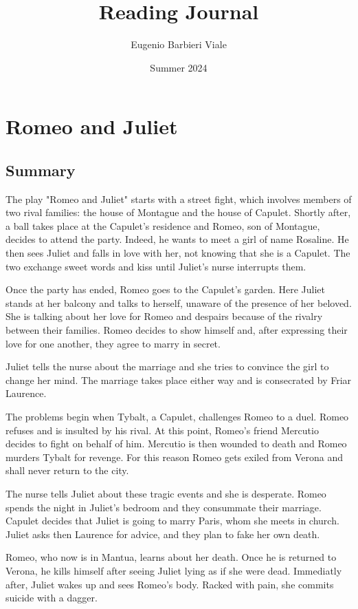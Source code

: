 \documentclass[]{article}
\title{Reading Journal}
\author{Eugenio Barbieri Viale}
\date{Summer 2024}
\begin{document}
\maketitle
{}
\tableofcontents
\newpage

\section{Romeo and Juliet}
\subsection*{Summary}
\hspace{1em}
The play "Romeo and Juliet" starts with a street fight, which involves members of two rival families: the house of Montague and the house of Capulet. Shortly after, a ball takes place at the Capulet's residence and Romeo, son of Montague, decides to attend the party. Indeed, he wants to meet a girl of name Rosaline. He then sees Juliet and falls in love with her, not knowing that she is a Capulet. The two exchange sweet words and kiss until Juliet's nurse interrupts them.

Once the party has ended, Romeo goes to the Capulet's garden. Here Juliet stands at her balcony and talks to herself, unaware of the presence of her beloved. She is talking about her love for Romeo and despairs because of the rivalry between their families. Romeo decides to show himself and, after expressing their love for one another, they agree to marry in secret.

Juliet tells the nurse about the marriage and she tries to convince the girl to change her mind. The marriage takes place either way and is consecrated by Friar Laurence.

The problems begin when Tybalt, a Capulet, challenges Romeo to a duel. Romeo refuses and is insulted by his rival. At this point, Romeo's friend Mercutio decides to fight on behalf of him. Mercutio is then wounded to death and Romeo murders Tybalt for revenge. For this reason Romeo gets exiled from Verona and shall never return to the city.

The nurse tells Juliet about these tragic events and she is desperate. Romeo spends the night in Juliet's bedroom and they consummate their marriage. Capulet decides that Juliet is going to marry Paris, whom she meets in church. Juliet asks then Laurence for advice, and they plan to fake her own death.

Romeo, who now is in Mantua, learns about her death. Once he is returned to Verona, he kills himself after seeing Juliet lying as if she were dead. Immediatly after, Juliet wakes up and sees Romeo's body. Racked with pain, she commits suicide with a dagger.
\end{document}
